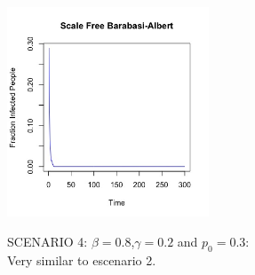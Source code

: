 \documentclass{article}
\begin{document}
\begin{center}
    \includegraphics[width=6cm]{barabasi_albert_3.jpeg}
    
\end{center}

\newpage

\noindent SCENARIO 4: $\beta = 0.8$,$\gamma = 0.2$ and $p_{0} = 0.3$: \\

\noindent Very similar to escenario 2.\\
\end{document}
